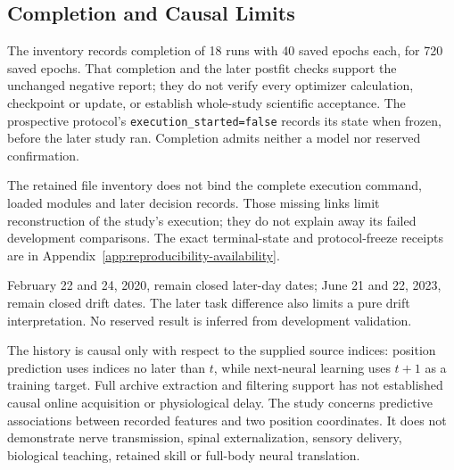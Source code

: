 \subsection{Completion and Causal Limits}

The inventory records completion of 18 runs with 40 saved epochs each, for 720 saved epochs. That completion and the later postfit checks support the unchanged negative report; they do not verify every optimizer calculation, checkpoint or update, or establish whole-study scientific acceptance. The prospective protocol's \texttt{execution\_started=false} records its state when frozen, before the later study ran. Completion admits neither a model nor reserved confirmation.

The retained file inventory does not bind the complete execution command, loaded modules and later decision records. Those missing links limit reconstruction of the study's execution; they do not explain away its failed development comparisons. The exact terminal-state and protocol-freeze receipts are in Appendix~\ref{app:reproducibility-availability}.

February 22 and 24, 2020, remain closed later-day dates; June 21 and 22, 2023,
remain closed drift dates. The later task difference also limits a pure drift
interpretation. No reserved result is inferred from development validation.

The history is causal only with respect to the supplied source indices:
position prediction uses indices no later than $t$, while next-neural learning
uses $t+1$ as a training target. Full archive extraction and filtering support
has not established causal online acquisition or physiological delay. The
study concerns predictive associations between recorded features and two
position coordinates. It does not demonstrate nerve transmission, spinal
externalization, sensory delivery, biological teaching, retained skill or
full-body neural translation.
